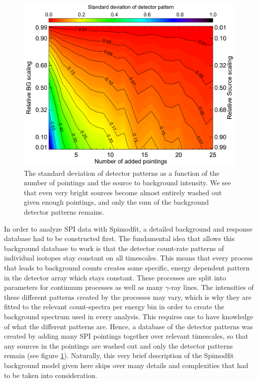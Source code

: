 \documentclass{report}
\begin{document}
\begin{figure}
  \includegraphics[width=\linewidth]{Images/General/SMF_background_pattern_siegert_2019.PNG}
  \caption{The standard deviation of detector patterns as a function of the number of pointings and the source to background intensity. We see that even very bright sources become almost entirely washed out given enough pointings, and only the sum of the background detector patterns remains. \cite{refId1}}
  \vspace{-0pt}
  \label{smf_background_model_idea}
  \vspace{-35pt}
\end{figure}

In order to analyze SPI data with Spimodfit, a detailed background and response database had to be constructed first. The fundamental idea that allows this background database to work is that the detector count-rate patterns of individual isotopes stay constant on all timescales. This means that every process that leads to background counts creates some specific, energy dependent pattern in the detector array which stays constant. These processes are split into parameters for continuum processes as well as many $\gamma$-ray lines. The intensities of these different patterns created by the processes may vary, which is why they are fitted to the relevant count-spectra per energy bin in order to create the background spectrum used in every analysis. This requires one to have knowledge of what the different patterns are. Hence, a database of the detector patterns was created by adding many SPI pointings together over relevant timescales, so that any sources in the pointings are washed out and only the detector patterns remain (see figure \ref{smf_background_model_idea}). Naturally, this very brief description of the Spimodfit background model given here skips over many details and complexities that had to be taken into consideration.
\end{document}
